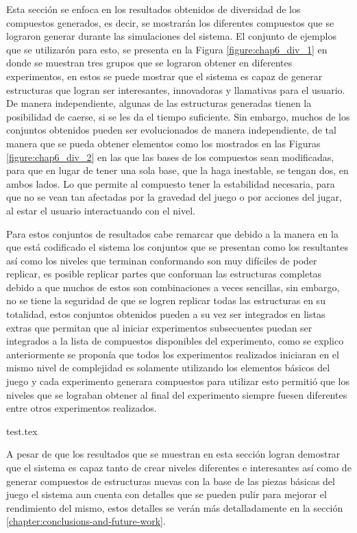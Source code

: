 Esta sección se enfoca en los resultados
obtenidos de diversidad de los compuestos generados, es decir, se mostrarán los
diferentes compuestos que se lograron generar durante las simulaciones del
sistema. El conjunto de ejemplos que se utilizarón para esto, se presenta en la
Figura \ref{figure:chap6_div_1} en donde se muestran tres grupos 
que se lograron obtener en diferentes experimentos, en estos se
puede mostrar que el sistema es capaz de generar estructuras que logran ser
interesantes, innovadoras y llamativas para el usuario. De manera independiente,
algunas de las estructuras generadas tienen la posibilidad de caerse, si se les da
el tiempo suficiente. Sin embargo, muchos de los conjuntos obtenidos pueden ser evolucionados de manera
independiente, de tal manera que se pueda obtener elementos como los mostrados en
las Figuras \ref{figure:chap6_div_2} en las que las bases de los compuestos
sean modificadas, para que en lugar de tener una sola base, que la haga inestable,
se tengan dos, en ambos lados. Lo que permite al compuesto tener la estabilidad
necesaria, para que no se vean tan afectadas por la gravedad del juego o por
acciones del jugar, al estar el usuario interactuando con el nivel.

Para estos conjuntos de resultados cabe remarcar que debido a la manera en la que
está codificado el sistema los conjuntos que se presentan como los resultantes
así como los niveles que terminan conformando son muy difíciles de poder
replicar, es posible replicar partes que conforman las estructuras completas
debido a que muchos de estos son combinaciones a veces sencillas, sin embargo, no
se tiene la seguridad de que se logren replicar todas las estructuras en su
totalidad, estos conjuntos obtenidos pueden a su vez ser integrados en listas
extras que permitan que al iniciar experimentos subsecuentes puedan ser
integrados a la lista de compuestos disponibles del experimento, como se explico
anteriormente se proponía que todos los experimentos realizados iniciaran en el
mismo nivel de complejidad es solamente utilizando los elementos básicos del
juego y cada experimento generara compuestos para utilizar esto permitió que los
niveles que se lograban obtener al final del experimento siempre fuesen
diferentes entre otros experimentos realizados.

{test.tex}

A pesar de que los resultados que se muestran en esta sección logran demostrar
que el sistema es capaz tanto de crear niveles diferentes e interesantes así
como de generar compuestos de estructuras nuevas con la base de las piezas
básicas del juego el sistema aun cuenta con detalles que se pueden pulir para
mejorar el rendimiento del mismo, estos detalles se verán más detalladamente en
la sección \ref{chapter:conclusions-and-future-work}.
